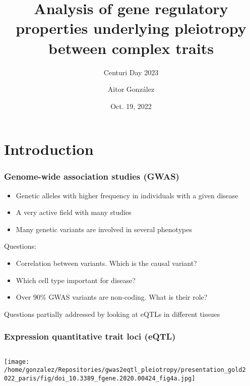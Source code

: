 \documentclass{beamer}
\title{Analysis of gene regulatory properties underlying pleiotropy between complex traits}
\subtitle{Centuri Day 2023}
\author{Aitor Gonz\'alez}
\institute{Aix Marseille Univ, INSERM, TAGC}
\date{Oct. 19, 2022}
\begin{document}
\begin{frame}

\titlepage

\end{frame}


\section{Introduction} %

\begin{frame}
\frametitle{Genome-wide association studies (GWAS)}

\begin{itemize}
\item Genetic alleles with higher frequency in individuals with a given disease
\item A very active field with many studies
\item Many genetic variants are involved in several phenotypes
\end{itemize}
%
\vfill
%
Questions:
%
\begin{itemize}
\item Correlation between variants. Which is the causal variant?
\item Which cell type important for disease?
\item Over 90\% GWAS variants are non-coding. What is their role?
\end{itemize}
%
\vfill
%
Questions partially addressed by looking at eQTLs in different tissues

\let\thefootnote\relax{}

\end{frame}

\begin{frame}
\frametitle{Expression quantitative trait loci (eQTL)}

\begin{columns}
\begin{column}{0.5\textwidth}
    \begin{center}
\texttt{[image: /home/gonzalez/Repositories/gwas2eqtl\_pleiotropy/presentation\_gold2022\_paris/fig/doi\_10.3389\_fgene.2020.00424\_fig4a.jpg]}
     \end{center}
\end{column}
\begin{column}{0.5\textwidth}

\end{column}
\end{columns}

\let\thefootnote\relax{}
\end{frame}
\end{document}
